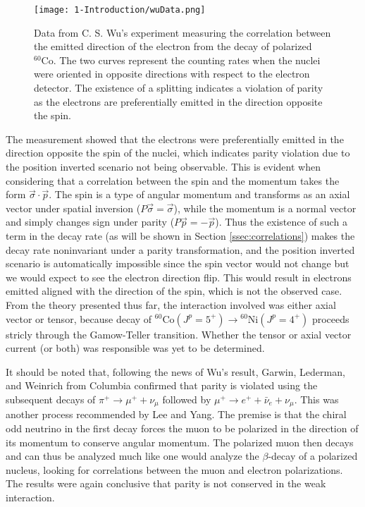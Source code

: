 \begin{figure}[h]
  \centering
  \texttt{[image: 1-Introduction/wuData.png]}  
  \caption{Data from C. S. Wu's experiment measuring the correlation between the emitted
    direction of the electron from the decay of polarized $^{60}\mathrm{Co}$. The two
    curves represent the counting rates when the nuclei were oriented in opposite
    directions with respect to the electron detector. The existence of a splitting
    indicates a violation of parity as the electrons are preferentially emitted in the
    direction opposite the spin.}
  \label{fig:wuData}
\end{figure}

The measurement showed that the electrons were preferentially
emitted in the direction opposite the spin of the nuclei, which indicates parity violation due to
the position inverted scenario not being observable. This is evident when considering that
a correlation between the spin and the momentum takes the form $\vec{\sigma} \cdot \vec{p}$.
The spin is a type of angular momentum and transforms as an axial vector under spatial inversion
($P\vec{\sigma}=\vec{\sigma}$), while the momentum is a normal vector and
simply changes sign under parity ($P\vec{p}=-\vec{p}$). Thus the existence of
such a term in the decay rate (as will be shown in Section \ref{ssec:correlations}) makes the
decay rate noninvariant under a parity transformation, and the position inverted scenario
is automatically impossible since the spin vector would not change but we would expect to see
the electron direction flip. This would result in electrons emitted aligned with the direction
of the spin, which is not the observed case. From the theory presented thus far,
the interaction involved was either axial vector or tensor, because decay of
$^{60}\mathrm{Co} (J^p=5^+) \rightarrow {^{60}\mathrm{Ni}}(J^p=4^+)$ proceeds stricly through
the Gamow-Teller transition. Whether the tensor or axial vector current (or both) was responsible
was yet to be determined.

It should be noted that, following the news of Wu's result, Garwin, Lederman, and
Weinrich \cite{garwin1957} from Columbia confirmed
that parity is violated using the subsequent decays of $\pi^+ \rightarrow \mu^++\nu_\mu$
followed by $\mu^+ \rightarrow e^+ + \bar{\nu}_e + \nu_\mu$. This was another process
recommended by Lee and Yang. The premise is that the chiral odd neutrino in the first decay
forces the muon to be polarized in the direction of its momentum to conserve angular
momentum. The polarized muon then decays and can thus be analyzed much like one would analyze the
$\beta$-decay of a polarized nucleus, looking for correlations between the muon and
electron polarizations. The results were again conclusive that parity is not conserved in the weak
interaction.

